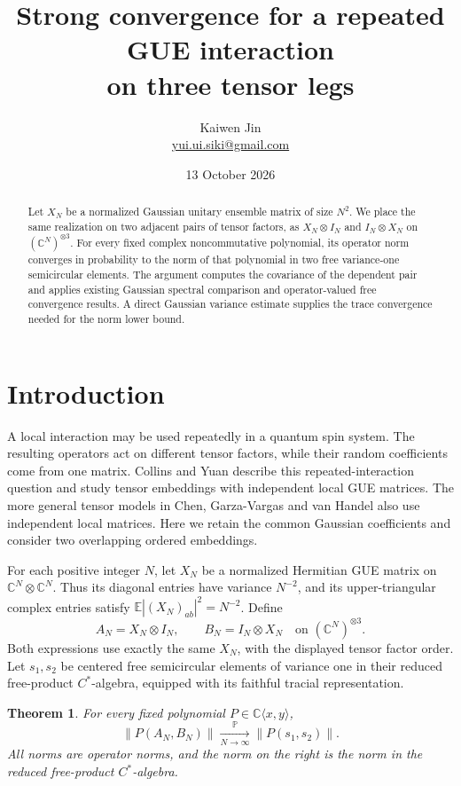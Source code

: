 \documentclass[11pt]{article}
\title{Strong convergence for a repeated GUE interaction\\ on three tensor legs}
\author{Kaiwen Jin\\ \small\href{mailto:yui.ui.siki@gmail.com}{yui.ui.siki@gmail.com}}
\date{13 October 2026}
\newtheorem{theorem}{Theorem}[section]
\newcommand{\E}{\mathbb E}
\newcommand{\Prob}{\mathbb P}
\newcommand{\C}{\mathbb C}
\newcommand{\norm}[1]{\left\|#1\right\|}
\begin{document}
\maketitle

\begin{abstract}
Let $X_N$ be a normalized Gaussian unitary ensemble matrix of size $N^2$.
We place the same realization on two adjacent pairs of tensor factors,
as $X_N\otimes I_N$ and $I_N\otimes X_N$ on $(\C^N)^{\otimes3}$.
For every fixed complex noncommutative polynomial, its operator norm
converges in probability to the norm of that polynomial in two free
variance-one semicircular elements. The argument computes the covariance
of the dependent pair and applies existing Gaussian spectral comparison
and operator-valued free convergence results. A direct Gaussian variance
estimate supplies the trace convergence needed for the norm lower bound.
\end{abstract}

\section{Introduction}

A local interaction may be used repeatedly in a quantum spin system.
The resulting operators act on different tensor factors, while their
random coefficients come from one matrix. Collins and Yuan
\cite[Section~1.1 and Section~5(2)]{CY}
describe this repeated-interaction question and study tensor embeddings
with independent local GUE matrices. The more general tensor models in
Chen, Garza-Vargas and van Handel \cite[Section~9.4, Theorem~9.8]{CGV}
also use independent local matrices. Here we retain the common Gaussian
coefficients and consider two overlapping ordered embeddings.

For each positive integer $N$, let $X_N$ be a normalized Hermitian GUE
matrix on $\C^N\otimes\C^N$. Thus its diagonal entries have variance
$N^{-2}$, and its upper-triangular complex entries satisfy
$\E|(X_N)_{ab}|^2=N^{-2}$. Define
\begin{equation}\label{eq:model}
 A_N=X_N\otimes I_N,\qquad B_N=I_N\otimes X_N
 \quad\text{on }(\C^N)^{\otimes3}.
\end{equation}
Both expressions use exactly the same $X_N$, with the displayed tensor
factor order. Let $s_1,s_2$ be centered free semicircular elements of
variance one in their reduced free-product $C^*$-algebra, equipped with
its faithful tracial representation.

\begin{theorem}\label{thm:main}
For every fixed polynomial $P\in\C\langle x,y\rangle$,
\[
 \norm{P(A_N,B_N)}
 \xrightarrow[N\to\infty]{\Prob}
 \norm{P(s_1,s_2)}.
\]
All norms are operator norms, and the norm on the right is the norm in
the reduced free-product $C^*$-algebra.
\end{theorem}
\end{document}
